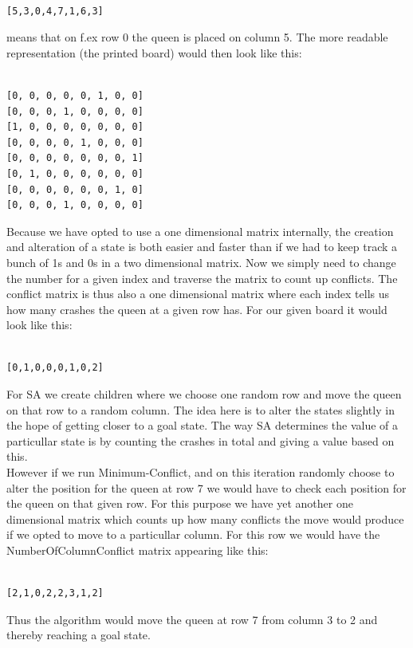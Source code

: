 \documentclass[12pt, a4paper]{article}
\begin{document}
\begin{verbatim}

[5,3,0,4,7,1,6,3]

\end{verbatim}
\noindent
means that on f.ex row 0 the queen is placed on column 5. The more readable representation (the printed board) would then look like this:

\begin{verbatim}

[0, 0, 0, 0, 0, 1, 0, 0]
[0, 0, 0, 1, 0, 0, 0, 0]
[1, 0, 0, 0, 0, 0, 0, 0]
[0, 0, 0, 0, 1, 0, 0, 0]
[0, 0, 0, 0, 0, 0, 0, 1]
[0, 1, 0, 0, 0, 0, 0, 0]
[0, 0, 0, 0, 0, 0, 1, 0]
[0, 0, 0, 1, 0, 0, 0, 0]

\end{verbatim}

\noindent
Because we have opted to use a one dimensional matrix internally, the creation and alteration of a state is both easier and faster than if we had to keep track a bunch of 1s and 0s in a two dimensional matrix. Now we simply need to change the number for a given index and traverse the matrix to count up conflicts. The conflict matrix is thus also a one dimensional matrix where each index tells us how many crashes the queen at a given row has. For our given board it would look like this:

\begin{verbatim}

[0,1,0,0,0,1,0,2]

\end{verbatim}

\noindent
For SA we create children where we choose one random row and move the queen on that row to a random column. The idea here is to alter the states slightly in the hope of getting closer to a goal state. The way SA determines the value of a particullar state is by counting the crashes in total and giving a value based on this. 
\\
However if we run Minimum-Conflict, and on this iteration randomly choose to alter the position for the queen at row 7 we would have to check each position for the queen on that given row. For this purpose we have yet another one dimensional matrix which counts up how many conflicts the move would produce if we opted to move to a particullar column. For this row we would have the NumberOfColumnConflict matrix appearing like this:

\begin{verbatim}

[2,1,0,2,2,3,1,2]

\end{verbatim}
\noindent
Thus the algorithm would move the queen at row 7 from column 3 to 2 and thereby reaching a goal state.
\end{document}

